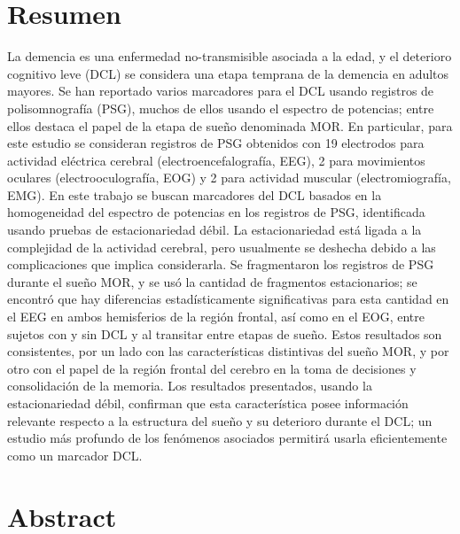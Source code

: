 \documentclass[12pt,letterpaper]{book}
\begin{document}
\setcounter{page}{1}

\chapter*{Resumen}

\begin{small}
La demencia es una enfermedad no-transmisible asociada a la edad, y el deterioro cognitivo leve (DCL) se considera una etapa temprana de la demencia en adultos mayores.
%
Se han reportado varios marcadores para el DCL usando registros de polisomnografía (PSG), muchos de ellos usando el espectro de potencias; entre ellos destaca el papel de la etapa de sueño denominada MOR. 
%
En particular, para este estudio se consideran registros de PSG obtenidos con 19 electrodos para actividad eléctrica cerebral (electroencefalografía, EEG), 2 para movimientos oculares (electrooculografía, EOG) y 2 para actividad muscular (electromiografía, EMG).
%
En este trabajo se buscan marcadores del DCL basados en la homogeneidad del espectro de potencias en los registros de PSG, identificada usando pruebas de estacionariedad débil.
%
La estacionariedad está ligada a la complejidad de la actividad cerebral, pero usualmente se deshecha debido a las complicaciones que implica considerarla. 
%
Se fragmentaron los registros de PSG durante el sueño MOR, y se usó la cantidad de fragmentos estacionarios; se encontró que hay diferencias estadísticamente significativas para esta cantidad en el EEG en ambos hemisferios de la región frontal, así como en el EOG, entre sujetos con y sin DCL y al transitar entre etapas de sueño.
%
Estos resultados son consistentes, por un lado con las características distintivas del sueño MOR, y por otro con el papel de la región frontal del cerebro en la toma de decisiones y consolidación de la memoria.
%
Los resultados presentados, usando la estacionariedad débil, confirman que esta característica posee información relevante respecto a la estructura del sueño y su deterioro durante el DCL; un estudio más profundo de los fenómenos asociados permitirá usarla eficientemente como un marcador DCL.
\end{small}

\chapter*{Abstract}
\end{document}
